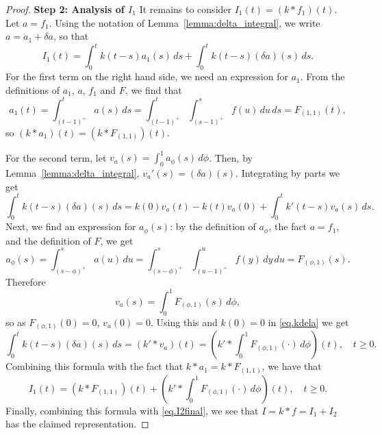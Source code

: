 \documentclass[10pt,a4paper]{amsart}
\begin{document}
\begin{proof}
		\textbf{Step 2: Analysis of $I_1$}
		It remains to consider $I_1(t) = (k * f_1)(t)$. Let $a = f_1$. Using the notation of Lemma~\ref{lemma:delta_integral}, we write $a = a_1 + \delta a$, so that 
		\[
		I_1(t)=\int_0^t k(t-s)a_1(s)\,ds + \int_0^t k(t-s)(\delta a)(s)\,ds. 
		\]
		For the first term on the right hand side, we need an expression for $a_1$. From the definitions of $a_1$, $a$, $f_1$ and $F$, we find that  
		\[
		a_1(t) = \int_{(t-1)^+}^t a(s) \, ds = \int_{(t-1)^+}^t \int_{(s-1)^+}^s f(u) \, du \, ds = F_{(1,1)}(t),
		\]
		so $(k\ast a_1)(t) = (k\ast F_{(1,1)})(t)$. 
		
		For the second term, let $v_a(s) = \int_0^1 a_\phi(s)\,d\phi$. Then, by Lemma~\ref{lemma:delta_integral}, $v_a'(s)=(\delta a)(s)$. Integrating by parts we get 
		\begin{equation} \label{eq.kdela}
			\int_0^t k(t-s)(\delta a)(s)\,ds = k(0)v_a(t)-k(t)v_a(0)+\int_0^t k'(t-s)v_a(s)\,ds.
		\end{equation}
		Next, we find an expression for $a_\phi(s)$: by the definition of $a_\phi$, the fact $a=f_1$, and the definition of $F$, we get 
		\[ 
		a_\phi(s) = \int_{(s-\phi)^+}^s a(u) \, du = \int_{(s-\phi)^+}^s \int_{(u-1)^+}^u f(y) \, dy \, du = F_{(\phi, 1)}(s). \]
		Therefore 
		\[
		v_a(s)=\int_0^1 F_{(\phi, 1)}(s)\,d\phi,
		\]
		so as $F_{(\phi,1)}(0)=0$, $v_a(0)=0$. Using this and $k(0)=0$ in \eqref{eq.kdela} we get 
		\[
		\int_0^t k(t-s)(\delta a)(s)\,ds = (k'\ast v_a)(t) = \left(k'\ast \int_0^1 F_{(\phi, 1)}(\cdot)\,d\phi\right)(t), \quad t\geq 0.	
		\]
		Combining this formula with the fact that $k\ast a_1 = k\ast F_{(1,1)}$, we have that 
		\[
		I_1(t)= (k\ast F_{(1,1)})(t)+\left(k'\ast \int_0^1 F_{(\phi, 1)}(\cdot)\,d\phi\right)(t), \quad t\geq 0.
		\]
		Finally, combining this formula with \eqref{eq.I2final}, we see that $I=k\ast f=I_1+I_2$ has the claimed representation. 
	\end{proof} 
\end{document}
